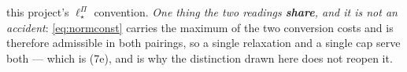 \begin{definition}
this project's $\ell^{\Pi}_\star$ convention. \emph{One thing the two readings \textbf{share}, and it is
not an accident}: \eqref{eq:normconst} carries the maximum of the two conversion costs and is therefore
admissible in both pairings, so a single relaxation and a single cap serve both --- which is
\textup{(7e)}, and is why the distinction drawn here does not reopen it.


\end{definition}

